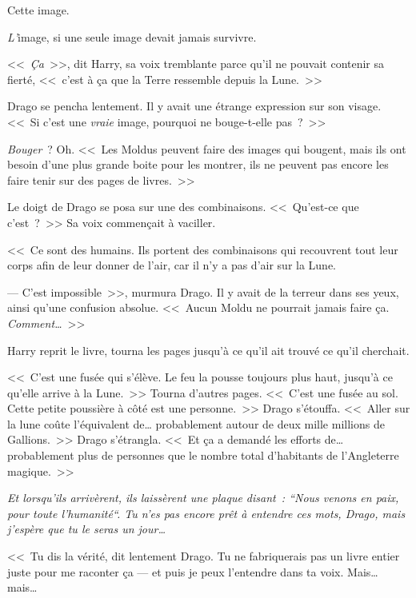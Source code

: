 Cette image.

\emph{L'}image, si une seule image devait jamais survivre.

<<~\emph{Ça}~>>, dit Harry, sa voix tremblante parce qu'il ne pouvait contenir sa fierté, <<~c'est à ça que la Terre ressemble depuis la Lune.~>>

Drago se pencha lentement. Il y avait une étrange expression sur son visage. <<~Si c'est une \emph{vraie} image, pourquoi ne bouge-t-elle pas~?~>>

\emph{Bouger}~? Oh. <<~Les Moldus peuvent faire des images qui bougent, mais ils ont besoin d'une plus grande boite pour les montrer, ils ne peuvent pas encore les faire tenir sur des pages de livres.~>>

Le doigt de Drago se posa sur une des combinaisons. <<~Qu'est-ce que c'est~?~>> Sa voix commençait à vaciller.

<<~Ce sont des humains. Ils portent des combinaisons qui recouvrent tout leur corps afin de leur donner de l'air, car il n'y a pas d'air sur la Lune.

--- C'est impossible~>>, murmura Drago. Il y avait de la terreur dans ses yeux, ainsi qu'une confusion absolue. <<~Aucun Moldu ne pourrait jamais faire ça. \emph{Comment…}~>>

Harry reprit le livre, tourna les pages jusqu'à ce qu'il ait trouvé ce qu'il cherchait.

<<~C'est une fusée qui s'élève. Le feu la pousse toujours plus haut, jusqu'à ce qu'elle arrive à la Lune.~>> Tourna d'autres pages. <<~C'est une fusée au sol. Cette petite poussière à côté est une personne.~>> Drago s'étouffa. <<~Aller sur la lune coûte l'équivalent de… probablement autour de deux mille millions de Gallions.~>> Drago s'étrangla. <<~Et ça a demandé les efforts de… probablement plus de personnes que le nombre total d'habitants de l'Angleterre magique.~>>

\emph{Et lorsqu'ils arrivèrent, ils laissèrent une plaque disant~: “Nous venons en paix, pour toute l'humanité“. Tu n'es pas encore prêt à entendre ces mots, Drago, mais j'espère que tu le seras un jour…}

<<~Tu dis la vérité, dit lentement Drago. Tu ne fabriquerais pas un livre entier juste pour me raconter ça — et puis je peux l'entendre dans ta voix. Mais… mais…

